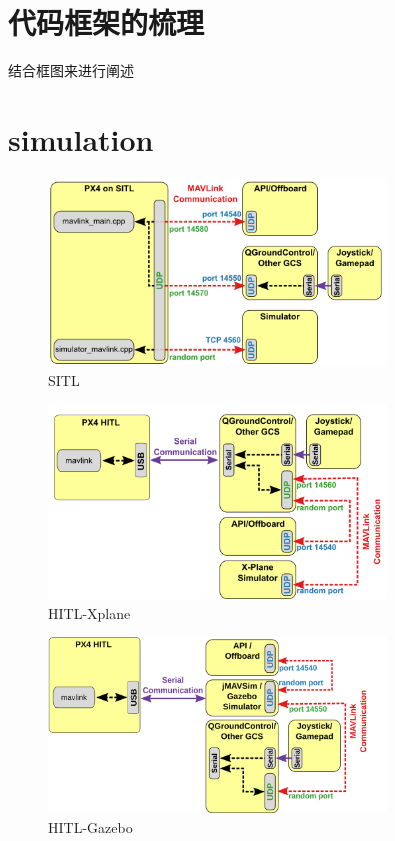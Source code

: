     \section{代码框架的梳理}
        结合框图来进行阐述
      
    \clearpage
    \section{simulation}
    \begin{figure}[htbp]
      \centering
      \includegraphics[width=0.8\textwidth]{pictures/chapter1/sitl.png}
      \caption{SITL}
    \end{figure}
    \begin{figure}[htbp]
      \centering
      \includegraphics[width=0.8\textwidth]{pictures/chapter1/hitl.png}
      \caption{HITL-Xplane}
    \end{figure}
    \begin{figure}[htbp]
      \centering
      \includegraphics[width=0.8\textwidth]{pictures/chapter1/hitl2.png}
      \caption{HITL-Gazebo}
    \end{figure}
    \clearpage
